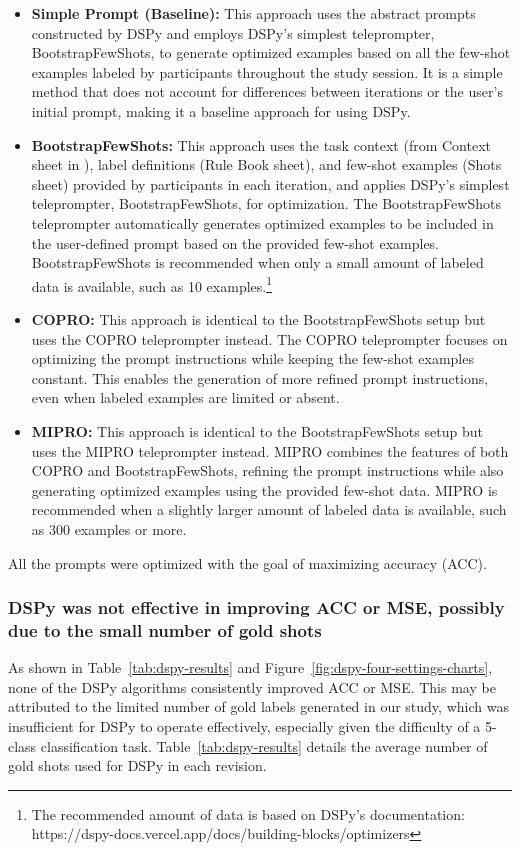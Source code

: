 \begin{itemize}
\item 
\textbf{Simple Prompt (Baseline):}
This approach uses the abstract prompts constructed by DSPy and employs DSPy's simplest teleprompter, BootstrapFewShots, to generate optimized examples based on all the few-shot examples labeled by participants throughout the study session. 
It is a simple method that does not account for differences between iterations or the user's initial prompt, making it a baseline approach for using DSPy.
\item 
\textbf{BootstrapFewShots:}
This approach uses the task context (from Context sheet in \system), label definitions (Rule Book sheet), and few-shot examples (Shots sheet) provided by participants in each iteration, and applies DSPy's simplest teleprompter, BootstrapFewShots, for optimization. 
The BootstrapFewShots teleprompter automatically generates optimized examples to be included in the user-defined prompt based on the provided few-shot examples.
BootstrapFewShots is recommended when only a small amount of labeled data is available, such as 10 examples.\footnote{The recommended amount of data is based on DSPy's documentation: https://dspy-docs.vercel.app/docs/building-blocks/optimizers}
\item 
\textbf{COPRO:}
This approach is identical to the BootstrapFewShots setup but uses the COPRO teleprompter instead. 
The COPRO teleprompter focuses on optimizing the prompt instructions while keeping the few-shot examples constant. 
This enables the generation of more refined prompt instructions, even when labeled examples are limited or absent.
\item 
\textbf{MIPRO:}
This approach is identical to the BootstrapFewShots setup but uses the MIPRO teleprompter instead. 
MIPRO combines the features of both COPRO and BootstrapFewShots, refining the prompt instructions while also generating optimized examples using the provided few-shot data. 
MIPRO is recommended when a slightly larger amount of labeled data is available, such as 300 examples or more.
\end{itemize}

All the prompts were optimized with the goal of maximizing accuracy (ACC).


\subsubsection{DSPy was not effective in improving ACC or MSE, possibly due to the small number of gold shots}
As shown in Table~\ref{tab:dspy-results} and Figure~\ref{fig:dspy-four-settings-charts}, none of the DSPy algorithms consistently improved ACC or MSE.
This may be attributed to the limited number of gold labels generated in our study, which was insufficient for DSPy to operate effectively, especially given the difficulty of a 5-class classification task. 
Table~\ref{tab:dspy-results} details the average number of gold shots used for DSPy in each revision.

